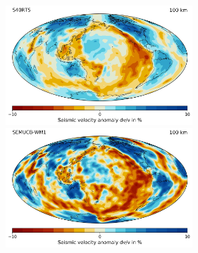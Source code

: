 \includegraphics[width=7cm]{python_codes/fieldstone_66/images/S40RTS_tomo_depth}
\includegraphics[width=7cm]{python_codes/fieldstone_66/images/SEMUCB-WM1_tomo_depth}

